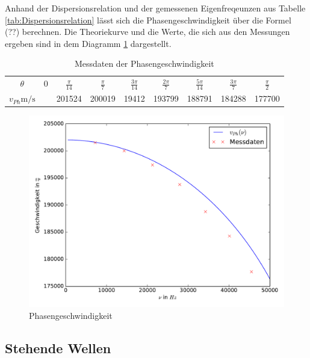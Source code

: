 Anhand der Dispersionsrelation und der gemessenen Eigenfreqeunzen aus Tabelle
\ref{tab:Dispersionsrelation} lässt sich die Phasengeschwindigkeit über die
Formel (??) berechnen.
Die Theoriekurve und die Werte, die sich aus den Messungen ergeben sind in
dem Diagramm \ref{fig:Phasengesch} dargestellt.

\FloatBarrier
\tiny{
\begin{table}
 \centering
 \begin{tabular}[width=\textwidth]{S| S S S S S S S S}
    \midrule
    $\theta$ & 0 & $\frac{\pi}{14}$ & $\frac{\pi}{7}$ & $\frac{3\pi}{14}$ & $\frac{2\pi}{7}$ & $\frac{5\pi}{14}$ & $\frac{3\pi}{7}$ & $\frac{\pi}{2}$ \\
    $v_{Ph}$$\si{\meter\per\second}$ & \text{\,\,\,\,\,\,\,\,\,\,\,\,\,\,\,\,--} & 201524 & 200019 & 19412 & 193799 & 188791 & 184288 & 177700 \\
    \bottomrule
\end{tabular}
  \caption{Messdaten der Phasengeschwindigkeit}
  \label{tab:Phasengesch}
\end{table}
}
\FloatBarrier

\begin{figure}
  \includegraphics[width=\textwidth]{Phasengesch.pdf}
  \caption{Phasengeschwindigkeit}
  \label{fig:Phasengesch}
\end{figure}

\subsection{Stehende Wellen}

